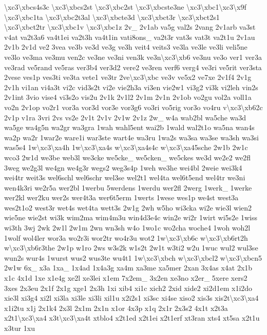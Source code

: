 {\textbackslash{}xc3\textbackslash{}xbcs4s3c \textbackslash{}xc3\textbackslash{}xbcs2st \textbackslash{}xc3\textbackslash{}xbc2st \textbackslash{}xc3\textbackslash{}xbcste3ne \textbackslash{}xc3\textbackslash{}xbc1\textbackslash{}xc3\textbackslash{}x9f \textbackslash{}xc3\textbackslash{}xbc1ta \textbackslash{}xc3\textbackslash{}xbc2t3al \textbackslash{}xc3\textbackslash{}xbcte3d \textbackslash{}xc3\textbackslash{}xbct3r \textbackslash{}xc3\textbackslash{}xbct2s1 \textbackslash{}xc3\textbackslash{}xbct2tr \textbackslash{}xc3\textbackslash{}xbc1v \textbackslash{}xc3\textbackslash{}xbc1z 2v\-\_\- 2v1ab va5g val2s 2vang 2v1arb va3st v4at va2t3a6 va4t1ei va2t3h va4t1in vati8ons\-\_\- va2t3r vat3s vat3t va2t1u 2v1au 2v1b 2v1d ve2 3vea ve3b ve3d ve3g ve3h veit4 veits3 ve3la ve3le ve3li veli5ne ve3lo ve3ma ve3mu ven2c ve3ne ve3ni ven3k ve3n\textbackslash{}xc3\textbackslash{}xb6 ve3nu ve3o ver1 ver3a ve3rad ve5rand ve5ras ver3b4 ver3d2 vere2 ve3ren verf6 verg4 ve3ri ve5rit ver3sta 2vese ves1p ves3ti ve3ta vete1 ve3tr 2ve\textbackslash{}xc3\textbackslash{}xbc ve3v ve5x2 ve7xe 2v1f4 2v1g 2v1h vi1an vi4a3t vi2c vid3s2t vi2e vie2h3a vi3en vie2w1 vi3g2 vi3k vi2leh vin2s 2v1int 3vio vise4 vi3s2o vis2u 2v1k 2v1l2 2v1m 2v1n 2v1ob vo2gu vol2a voll1a vo2n 2v1op vo2r1 vor3a vor3d vor3e vor3g6 vo3ri vo5rig vor3o vo4ru v\textbackslash{}xc3\textbackslash{}xb62c 2v1p v1ra 3vri 2vs vs2e 2v1t 2v1v 2v1w 2v1z 2w\-\_\- w4a wab2bl wa5che wa3d wa5ge wa4g5n wa2gr wa3gra 1wah wahl5ent wai2b 1wald wal2t1o wa5na wan4s wa2p wa2r 1war2e ware1i war3ste wart4e wa3ru 1wa2s wa3sa wa3se wa3sh wa3si was5s4 1w\textbackslash{}xc3\textbackslash{}xa4h 1w\textbackslash{}xc3\textbackslash{}xa4s w\textbackslash{}xc3\textbackslash{}xa4s4c w\textbackslash{}xc3\textbackslash{}xa45sche 2w1b 2w1c wco3 2w1d we3be web3l we3cke we5cke\-\_\- we5cken\-\_\- we5ckes we3d we2e2 we2fl 3weg we2g3l we4gn we4g3r wegs2 weg3s4p 1weh we3he wei4bl 2weie wei3k4 wei4tr weit3s wel6schl wel6schr wel3se wel2t1 wel4ta wel6t5end wel4tr we3ni wen4k3ri we2r5a wer2bl 1werbu 5werdens 1werdu wer2fl 2werg 1werk\-\_\- 1werke wer2kl wer2ku wer2s wer4t3a wer6t5erm 1werts 1wese wes1p we4st west3a wes2t1o2 west3r wet4s wet4ta wett3s 2w1g 2wh w5ho wi3cka wi2e wie3l wien2 wie5ne wie2st wi3k wim2ma wim4m3u win4d3e4c win2e wi2r 1wirt wi5s2e 1wiss wi3th 3wj 2wk 2w1l 2w1m 2wn wn3sh w4o 1wo1c wo2cha woche4 1woh woh2l 1wolf wol4ler wor3a wo2r3i wor2tr wo4r3u wot2 1w\textbackslash{}xc3\textbackslash{}xb6c w\textbackslash{}xc3\textbackslash{}xb6rt2h w\textbackslash{}xc3\textbackslash{}xb6r3the 2w1p w1ro 2ws w3s2k w1s2t 2w1t w3ti2 w2u 1wuc wul2 wul3se wun2s wur4s 1wurst wus2 wus3te wu4t1 1w\textbackslash{}xc3\textbackslash{}xbch w\textbackslash{}xc3\textbackslash{}xbcl2 w\textbackslash{}xc3\textbackslash{}xbcn5 2w1w 6x\-\_\- x3a 1xa\-\_\- 1x4ad 1x4a3g xa4m xa3me xa5mer 2xan 3x4as x4at 2x1b x1c 4x1d 1xe x1e4g xe2l xe3lei x1em 7x2em\-\_\- 3x2en xe3no x2er\-\_\- 5xere xers2 3xes 2x3eu 2x1f 2x1g xge1 2x3h 1xi xib4 xi1c xich2 2xid xide2 xi2d1em x1i2do xie3l xi3g4 xi2l xi3la xi3le xi3li xil1u x2i2s1 xi3sc xi4se xiso2 xis3s xis2t\textbackslash{}xc3\textbackslash{}xa4 x1i2tu x1j 2x1k4 2x3l 2x1m 2x1n x1or 4x3p x1q 2x1r 2x3s2 4x1t x2t3a x2t1\textbackslash{}xc3\textbackslash{}xa4 x3t\textbackslash{}xc3\textbackslash{}xa4t xtblo4 x2t1ed x2t1ei x2t1erf xt3ran xts4 xt5sa x2t1u x3tur 1xu }
